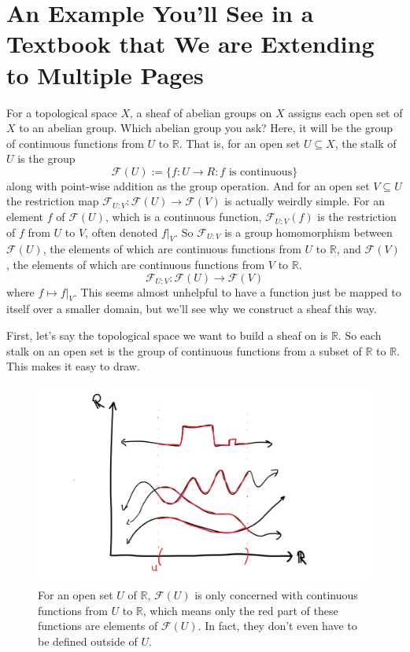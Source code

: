 \documentclass{tufte-handout}
\newcommand{\F}{\mathcal{F}}
\newcommand{\R}{\mathbb{R}}
\begin{document}
\section{An Example You'll See in a Textbook that We are Extending to Multiple Pages}

For a topological space $X$, a sheaf of abelian groups on $X$ assigns each open set of $X$ to an abelian group. Which abelian group you ask? Here, it will be the group of continuous functions from $U$ to $\R$. That is, for an open set $U \subseteq X$, the stalk of $U$ is the group
\[
    \F(U) := \{f: U \rightarrow R: f \text{ is continuous}\}
\]
along with point-wise addition as the group operation. And for an open set $V \subseteq U$ the restriction map $\F_{U:V}: \F(U) \rightarrow \F(V)$ is actually weirdly simple. For an element $f$ of $\F(U)$, which is a continuous function, $\F_{U:V}(f)$ is the restriction of $f$ from $U$ to $V$, often denoted $f|_V$. So $\F_{U:V}$ is a group homomorphism between $\F(U)$, the elements of which are continuous functions from $U$ to $\R$, and $\F(V)$, the elements of which are continuous functions from $V$ to $\R$.
\[
    \F_{U:V}: \F(U) \rightarrow \F(V)
\]
where $f \mapsto f|_V$. This seems almost unhelpful to have a function just be mapped to itself over a smaller domain, but we'll see why we construct a sheaf this way. 

First, let's say the topological space we want to build a sheaf on is $\R$. So each stalk on an open set is the group of continuous functions from a subset of $\R$ to $\R$. This makes it easy to draw. 

\begin{figure}[h!]
    \centering
    \includegraphics{contonR.png}
    \caption{For an open set $U$ of $\R$, $\F(U)$ is only concerned with continuous functions from $U$ to $\R$, which means only the red part of these functions are elements of $\F(U)$. In fact, they don't even have to be defined outside of $U$.}
    \label{fig:contonR}
\end{figure}
\end{document}
